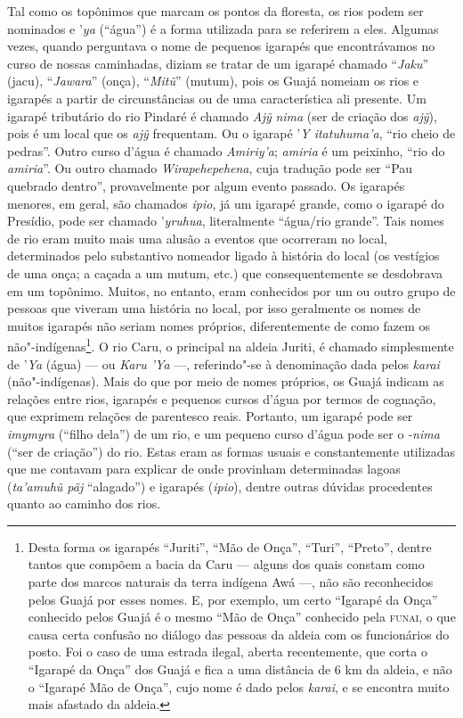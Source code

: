 Tal como os topônimos que marcam os pontos da floresta, os rios podem ser nominados 
e '\emph{ya} (``água'') é a forma utilizada para se
referirem a eles. Algumas vezes, quando perguntava o nome de pequenos
igarapés que encontrávamos no curso de nossas caminhadas, diziam se
tratar de um igarapé chamado ``\emph{Jaku}'' (jacu), ``\emph{Jawara}''
(onça), ``\emph{Mitũ}'' (mutum), pois os Guajá nomeiam os rios e igarapés
a partir de circunstâncias ou de uma característica ali presente. Um
igarapé tributário do rio Pindaré é chamado \emph{Ajỹ} \emph{nima} (ser
de criação dos \emph{ajỹ}), pois é um local que os \emph{ajỹ}
frequentam. Ou o igarapé '\emph{Y itatuhuma'a}, ``rio cheio de pedras''.
Outro curso d'água é chamado \emph{Amiriy'a}; \emph{amiria} é um
peixinho, ``rio do \emph{amiria}''. Ou outro chamado
\emph{Wirapehepehena}, cuja tradução pode ser  ``Pau quebrado dentro'',
provavelmente por algum evento passado. Os igarapés menores, em geral,
são chamados \emph{ipio}, já um igarapé grande, como o igarapé do
Presídio, pode ser chamado '\emph{yruhua}, literalmente ``água/rio
grande''. Tais nomes de rio eram muito mais uma alusão a eventos que
ocorreram no local, determinados pelo substantivo nomeador ligado à
história do local (os vestígios de uma onça; a caçada a um mutum, etc.)
que consequentemente se desdobrava em um topônimo. Muitos, no entanto,
eram conhecidos por um ou outro grupo de pessoas que viveram uma
história no local, por isso geralmente os nomes de muitos igarapés não
seriam nomes próprios, diferentemente de como fazem os
não"-indígenas\footnote{Desta forma os igarapés ``Juriti'', ``Mão de Onça'',
  ``Turi'', ``Preto'', dentre tantos que compõem a bacia da Caru --- alguns
  dos quais constam como parte dos marcos naturais da terra indígena
  Awá ---, não são reconhecidos pelos Guajá por esses nomes. E, por
  exemplo, um certo ``Igarapé da Onça'' conhecido pelos Guajá é o mesmo
  ``Mão de Onça'' conhecido pela \textsc{funai}, o que causa certa confusão no
  diálogo das pessoas da aldeia com os funcionários do posto. Foi o caso
  de uma estrada ilegal, aberta recentemente, que corta o ``Igarapé da
      Onça'' dos Guajá e fica a uma distância de 6 km da aldeia, e não o
  ``Igarapé Mão de Onça'', cujo nome é dado pelos \emph{karai}, e se
  encontra muito mais afastado da aldeia.}. O rio Caru, o principal na
aldeia Juriti, é chamado simplesmente de '\emph{Ya} (água) --- ou
\emph{Karu 'Ya} ---, referindo"-se à denominação dada pelos \emph{karai}
(não"-indígenas). Mais do que por meio de nomes próprios, os Guajá
indicam as relações entre rios, igarapés e pequenos cursos d'água por
termos de cognação, que exprimem relações de parentesco reais. Portanto,
um igarapé pode ser \emph{imymyra} (``filho dela'') de um rio, e um
pequeno curso d'água pode ser o \emph{-nima} (``ser de criação'') do rio.
Estas eram as formas usuais e constantemente utilizadas que me contavam
para explicar de onde provinham determinadas lagoas (\emph{ta'amuhũ pãj}
``alagado'') e igarapés (\emph{ipio}), dentre outras dúvidas procedentes
quanto ao caminho dos rios.

